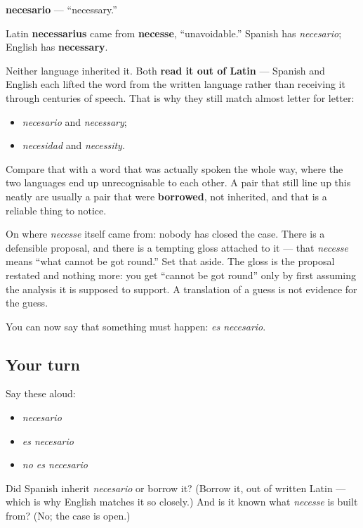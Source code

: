 \begin{cousinweb}
\textbf{necesario} — \textquotedblleft{}necessary.\textquotedblright{}

Latin \textbf{necessarius} came from \textbf{necesse}, \textquotedblleft{}unavoidable.\textquotedblright{} Spanish has \emph{necesario}; English has \textbf{necessary}.

Neither language inherited it. Both \textbf{read it out of Latin} — Spanish and English each lifted the word from the written language rather than receiving it through centuries of speech. That is why they still match almost letter for letter:

\begin{itemize}
\raggedright
  \item \emph{necesario} and \emph{necessary};
  \item \emph{necesidad} and \emph{necessity}.
\end{itemize}

Compare that with a word that was actually spoken the whole way, where the two languages end up unrecognisable to each other. A pair that still line up this neatly are usually a pair that were \textbf{borrowed}, not inherited, and that is a reliable thing to notice.

On where \emph{necesse} itself came from: nobody has closed the case. There is a defensible proposal, and there is a tempting gloss attached to it — that \emph{necesse} means \textquotedblleft{}what cannot be got round.\textquotedblright{} Set that aside. The gloss is the proposal restated and nothing more: you get \textquotedblleft{}cannot be got round\textquotedblright{} only by first assuming the analysis it is supposed to support. A translation of a guess is not evidence for the guess.
\end{cousinweb}

\begin{grammarlens}[title={What you've built}]
You can now say that something must happen: \emph{es necesario}.
\end{grammarlens}

\subsection*{Your turn}
Say these aloud:

\begin{itemize}
\raggedright
  \item \emph{necesario}
  \item \emph{es necesario}
  \item \emph{no es necesario}
\end{itemize}

\begin{tcolorbox}[breakable,colback=teal!4,colframe=teal!35!black,title={Before you move on}]
Did Spanish inherit \emph{necesario} or borrow it? (Borrow it, out of written Latin — which is why English matches it so closely.) And is it known what \emph{necesse} is built from? (No; the case is open.)
\end{tcolorbox}
